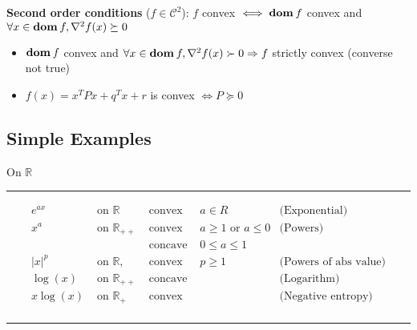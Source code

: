 \documentclass[a4paper, 10pt]{article}
\newcommand{\rline}{\vspace{0em}\noindent\rule{\textwidth}{1pt}\vspace{0em}}
\newcommand{\abs}[1]{|#1|}
\newcommand{\hess}[1]{\nabla^2{#1}}
\newcommand{\R}{\mathbb{R}}
\newcommand{\Rp}{\mathbb{R}_{+}}
\newcommand{\Rpp}{\mathbb{R}_{++}}
\newcommand{\dom}[1]{\textbf{dom}\hspace{0.2em}#1}
\newcommand{\itm}[1]{{\color{itmcolor} \textbf{#1}}}
\begin{document}
\itm{Second order conditions} ($f \in \mathcal{C}^2$): $f$ convex $\iff \dom{f}$ convex and $\forall x \in \dom{f}, \hess{f}(x) \succeq 0$
\begin{itemize}
\item $\dom{f}$ convex and $\forall x \in \dom{f}, \hess{f}(x) \succ 0 \Rightarrow f$ strictly convex (converse not true)
\item $f(x) = x^T P x + q^T x + r$ is convex $\iff P \succeq 0$
\end{itemize}

\subsection{Simple Examples}

On $\R$\\
\rline
\begin{equation*}
  \begin{array}{lllll}
    e^{a x}   & \text{ on } \R   & \text{ convex }  & a \in R                     &\text{(Exponential)}         \\
    x^a       & \text{ on } \Rpp & \text{ convex }  & a \ge 1 \text{ or } a \le 0 &\text{(Powers)}              \\
              &                  & \text{ concave } & 0 \le a \le 1               &                      \\
    \abs{x}^p & \text{ on } \R,  & \text{ convex }  & p \ge 1                     &\text{(Powers of abs value)} \\
    \log(x)   & \text{ on } \Rpp & \text{ concave } &                             &\text{(Logarithm)}           \\
    x \log(x) & \text{ on } \Rp  & \text{ convex }  &                             &\text{(Negative entropy)}    \\
  \end{array}
\end{equation*}
\rline
\end{document}
